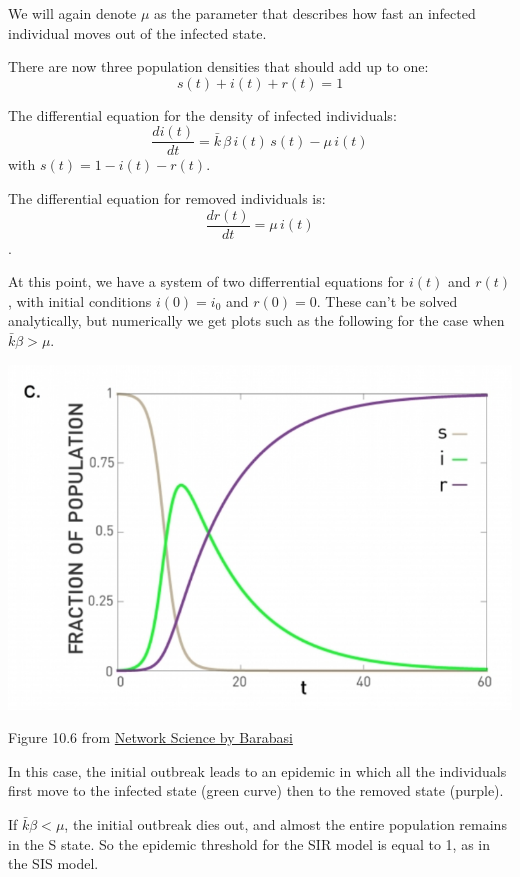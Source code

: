 \documentclass[11pt]{scrartcl} %
\begin{document}
We will again denote $\mu$ as the parameter that describes how fast an infected individual moves out of the infected state.

There are now three population densities that should add up to one:
\[ s(t) + i(t) + r(t) = 1 \]

The differential equation for the density of infected individuals:
\[ \frac{di(t)}{dt} = \bar{k} \, \beta \, i(t) \, s(t) - \mu\, i(t) \]
with $s(t) = 1 - i(t) - r(t) $.

The differential equation for removed individuals is:
\[ \frac{dr(t)}{dt} = \mu\, i(t) \].

At this point, we have a system of two differrential equations for $i(t)$ and $r(t)$, with initial conditions $i(0)=i_0$ and $r(0)=0$. These can't be solved analytically, but numerically we get plots such as the following for the case when $\bar{k}\beta > \mu$.

\begin{center}
\includegraphics[width=0.75\linewidth]{img/L9.3_SIRmodel.png}

{\tiny Figure 10.6 from \href{http://networksciencebook.com/}{Network Science by Barabasi}}
\end{center}

In this case, the initial outbreak leads to an epidemic in which all the individuals first move to the infected state (green curve) then to the removed state (purple).

If $\bar{k}\beta < \mu$, the initial outbreak dies out, and almost the entire population remains in the S state. So the epidemic threshold for the SIR model is equal to 1, as in the SIS model.
\end{document}
